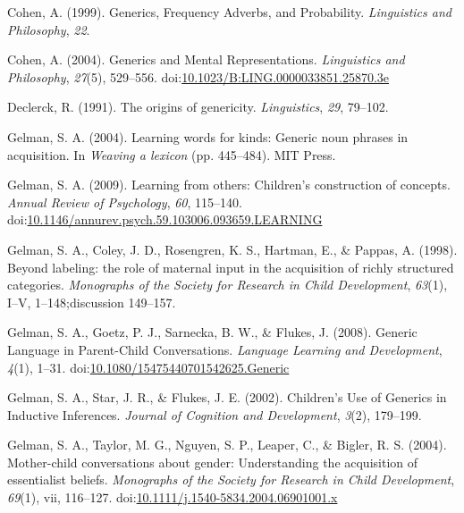 \documentclass[,man,floatsintext]{apa6}
\theoremstyle{definition}
\theoremstyle{definition}
\theoremstyle{definition}
\theoremstyle{remark}
\begin{document}
\leavevmode\hypertarget{ref-Cohen1999}{}%
Cohen, A. (1999). Generics, Frequency Adverbs, and Probability.
\emph{Linguistics and Philosophy}, \emph{22}.

\leavevmode\hypertarget{ref-Cohen2004}{}%
Cohen, A. (2004). Generics and Mental Representations. \emph{Linguistics
and Philosophy}, \emph{27}(5), 529--556.
doi:\href{https://doi.org/10.1023/B:LING.0000033851.25870.3e}{10.1023/B:LING.0000033851.25870.3e}

\leavevmode\hypertarget{ref-Declerck1991}{}%
Declerck, R. (1991). The origins of genericity. \emph{Linguistics},
\emph{29}, 79--102.

\leavevmode\hypertarget{ref-Gelman2004}{}%
Gelman, S. A. (2004). Learning words for kinds: Generic noun phrases in
acquisition. In \emph{Weaving a lexicon} (pp. 445--484). MIT Press.

\leavevmode\hypertarget{ref-Gelman2009}{}%
Gelman, S. A. (2009). Learning from others: Children's construction of
concepts. \emph{Annual Review of Psychology}, \emph{60}, 115--140.
doi:\href{https://doi.org/10.1146/annurev.psych.59.103006.093659.LEARNING}{10.1146/annurev.psych.59.103006.093659.LEARNING}

\leavevmode\hypertarget{ref-Gelman1998}{}%
Gelman, S. A., Coley, J. D., Rosengren, K. S., Hartman, E., \& Pappas,
A. (1998). Beyond labeling: the role of maternal input in the
acquisition of richly structured categories. \emph{Monographs of the
Society for Research in Child Development}, \emph{63}(1), I--V,
1--148;discussion 149--157.

\leavevmode\hypertarget{ref-Gelman2008}{}%
Gelman, S. A., Goetz, P. J., Sarnecka, B. W., \& Flukes, J. (2008).
Generic Language in Parent-Child Conversations. \emph{Language Learning
and Development}, \emph{4}(1), 1--31.
doi:\href{https://doi.org/10.1080/15475440701542625.Generic}{10.1080/15475440701542625.Generic}

\leavevmode\hypertarget{ref-Gelman2002}{}%
Gelman, S. A., Star, J. R., \& Flukes, J. E. (2002). Children's Use of
Generics in Inductive Inferences. \emph{Journal of Cognition and
Development}, \emph{3}(2), 179--199.

\leavevmode\hypertarget{ref-GelmanEtAl2004}{}%
Gelman, S. A., Taylor, M. G., Nguyen, S. P., Leaper, C., \& Bigler, R.
S. (2004). Mother-child conversations about gender: Understanding the
acquisition of essentialist beliefs. \emph{Monographs of the Society for
Research in Child Development}, \emph{69}(1), vii, 116--127.
doi:\href{https://doi.org/10.1111/j.1540-5834.2004.06901001.x}{10.1111/j.1540-5834.2004.06901001.x}
\end{document}
